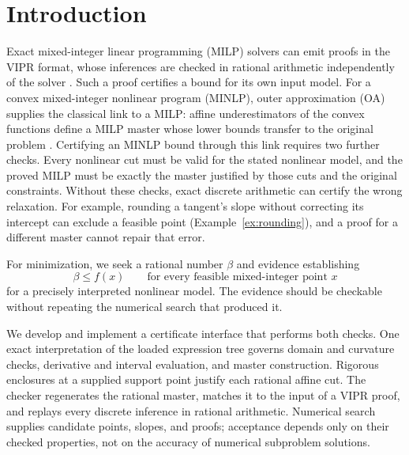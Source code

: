 \section{Introduction}
\label{sec:introduction}
Exact mixed-integer linear programming (MILP) solvers can emit proofs in the VIPR format, whose inferences are checked in rational arithmetic independently of the solver \citep{cheung2017-vipr,hojny2025-the-scip-optimization-suite-10}. Such a proof certifies a bound for its own input model. For a convex mixed-integer nonlinear program (MINLP), outer approximation (OA) supplies the classical link to a MILP: affine underestimators of the convex functions define a MILP master whose lower bounds transfer to the original problem \citep{duran1986-an-outer-approximation-algorithm-for,kronqvist2019-a-review-and-comparison-of}. Certifying an MINLP bound through this link requires two further checks. Every nonlinear cut must be valid for the stated nonlinear model, and the proved MILP must be exactly the master justified by those cuts and the original constraints. Without these checks, exact discrete arithmetic can certify the wrong relaxation. For example, rounding a tangent's slope without correcting its intercept can exclude a feasible point (Example~\ref{ex:rounding}), and a proof for a different master cannot repair that error.

For minimization, we seek a rational number $\beta$ and evidence establishing
\begin{equation}
  \beta\leq f(x)\qquad\text{for every feasible mixed-integer point }x
  \label{eq:intro-bound}
\end{equation}
for a precisely interpreted nonlinear model. The evidence should be checkable without repeating the numerical search that produced it.

We develop and implement a certificate interface that performs both checks. One exact interpretation of the loaded expression tree governs domain and curvature checks, derivative and interval evaluation, and master construction. Rigorous enclosures at a supplied support point justify each rational affine cut. The checker regenerates the rational master, matches it to the input of a VIPR proof, and replays every discrete inference in rational arithmetic. Numerical search supplies candidate points, slopes, and proofs; acceptance depends only on their checked properties, not on the accuracy of numerical subproblem solutions.

